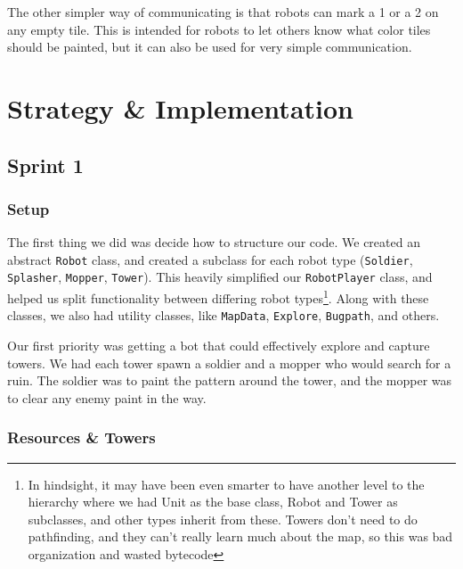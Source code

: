 \documentclass{article}
\begin{document}
  \medskip

  The other simpler way of communicating is that robots can mark a 1 or a 2 on any empty tile. This is intended for robots to let others know what color tiles should be painted, but it can also be used for very simple communication.

  \section{Strategy \& Implementation}

  \subsection{Sprint 1}

  \subsubsection{Setup}

  The first thing we did was decide how to structure our code. We created an abstract \verb|Robot| class, and created a subclass for each robot type (\verb|Soldier|, \verb|Splasher|, \verb|Mopper|, \verb|Tower|). This heavily simplified our \verb|RobotPlayer| class, and helped us split functionality between differing robot types\footnote{In hindsight, it may have been even smarter to have another level to the hierarchy where we had Unit as the base class, Robot and Tower as subclasses, and other types inherit from these. Towers don't need to do pathfinding, and they can't really learn much about the map, so this was bad organization and wasted bytecode}. Along with these classes, we also had utility classes, like \verb|MapData|, \verb|Explore|, \verb|Bugpath|, and others.

  \medskip

  Our first priority was getting a bot that could effectively explore and capture towers. We had each tower spawn a soldier and a mopper who would search for a ruin. The soldier was to paint the pattern around the tower, and the mopper was to clear any enemy paint in the way.

  \subsubsection{Resources \& Towers}
\end{document}
